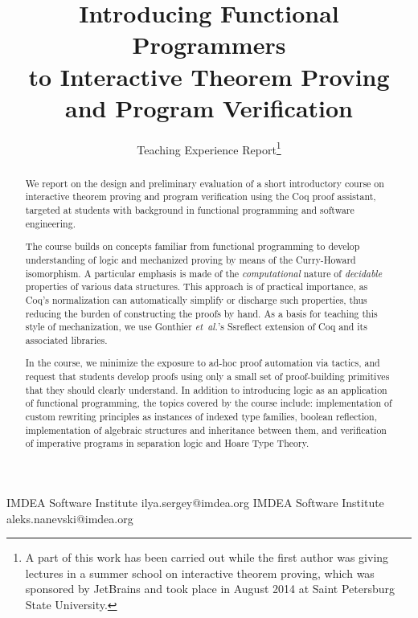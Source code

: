 \documentclass[blockstyle,preprint,nocopyrightspace]{sigplanconf}
\newcommand{\etal}{\emph{et~al.}\xspace}
\begin{document}
\setlength{\pdfpageheight}{\paperheight}
\setlength{\pdfpagewidth}{\paperwidth}


           {IMDEA Software Institute}
           {ilya.sergey@imdea.org}
%
           {IMDEA Software Institute}
           {aleks.nanevski@imdea.org}

\title{
  Introducing Functional Programmers\\
  to Interactive Theorem Proving and Program Verification
}

\subtitle{Teaching Experience Report\thanks{A part of this work has
    been carried out while the first author was giving lectures in a
    summer school on interactive theorem proving, which was sponsored
    by JetBrains and took place in August 2014 at Saint Petersburg
    State University.}}
\maketitle

\begin{abstract}

  We report on the design and preliminary evaluation of a short
  introductory course on interactive theorem proving and program
  verification using the Coq proof assistant, targeted at students
  with background in functional programming and software engineering.

  The course builds on concepts familiar from functional programming
  to develop understanding of logic and mechanized proving by means of
  the Curry-Howard isomorphism. A particular emphasis is made of the
  \emph{computational} nature of \emph{decidable} properties of
  various data structures. This approach is of practical importance,
  as Coq's normalization can automatically simplify or discharge such
  properties, thus reducing the burden of constructing the proofs by
  hand. As a basis for teaching this style of mechanization, we use
  Gonthier \etal's Ssreflect extension of Coq and its associated
  libraries.
  
  In the course, we minimize the exposure to ad-hoc proof automation
  via tactics, and request that students develop proofs using only a
  small set of proof-building primitives that they should clearly
  understand. In addition to introducing logic as an application of
  functional programming, the topics covered by the course include:
  implementation of custom rewriting principles as instances of
  indexed type families, boolean reflection, implementation of
  algebraic structures and inheritance between them, and verification
  of imperative programs in separation logic and Hoare Type Theory.

\end{abstract}
\end{document}
